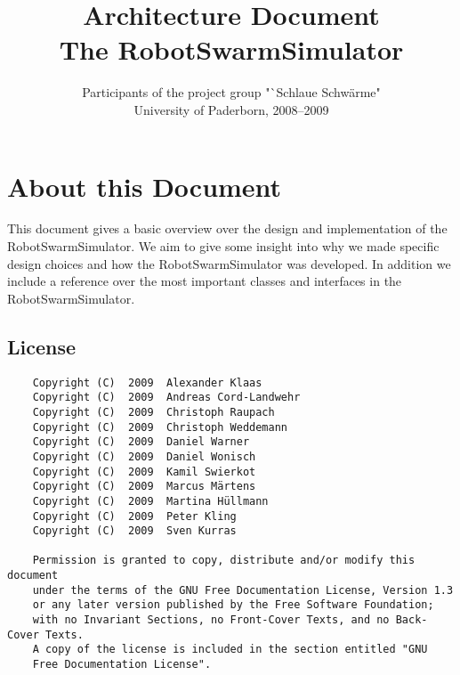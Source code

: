 \documentclass[a4paper,10pt]{book}
\title{\centering \Large Architecture Document\\[1cm] \Huge The RobotSwarmSimulator}
\author{Participants of the project group "`Schlaue Schwärme"\\ University of Paderborn, 2008--2009}
\newcommand{\RSS}{{\sf RobotSwarmSimulator}\xspace}
\begin{document}
	\frontmatter
	\maketitle


	\chapter*{About this Document}
	This document gives a basic overview over the design and implementation of the \RSS. We aim to give some insight into why we made specific design choices and how the \RSS was developed. In addition we include a reference over the most important classes and interfaces in the \RSS.

	\section*{License}

	\begin{verbatim}
	Copyright (C)  2009  Alexander Klaas
	Copyright (C)  2009  Andreas Cord-Landwehr
	Copyright (C)  2009  Christoph Raupach
	Copyright (C)  2009  Christoph Weddemann
	Copyright (C)  2009  Daniel Warner
	Copyright (C)  2009  Daniel Wonisch
	Copyright (C)  2009  Kamil Swierkot
	Copyright (C)  2009  Marcus Märtens
	Copyright (C)  2009  Martina Hüllmann
	Copyright (C)  2009  Peter Kling
	Copyright (C)  2009  Sven Kurras

	Permission is granted to copy, distribute and/or modify this document
	under the terms of the GNU Free Documentation License, Version 1.3
	or any later version published by the Free Software Foundation;
	with no Invariant Sections, no Front-Cover Texts, and no Back-Cover Texts.
	A copy of the license is included in the section entitled "GNU
	Free Documentation License". 
	\end{verbatim}

	\tableofcontents

	\mainmatter
	
	
	
\end{document}

